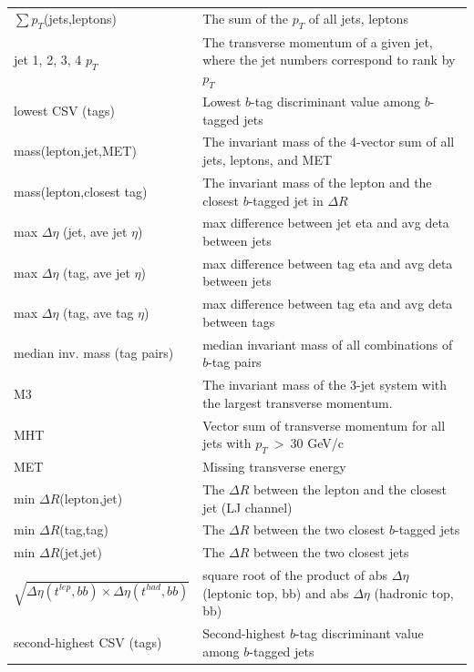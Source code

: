 \begin{table}[hbtp]
\begin{tabular}{| l | p{10cm} |}
   \(\sum p_{T}\)(jets,leptons)  							&  The sum of the \(p_{T}\) of all jets, leptons \\
   jet 1, 2, 3, 4 \(p_{T}\)  							&  The transverse momentum of a given jet, where the jet numbers correspond to rank by \(p_{T}\) \\
   lowest CSV (tags)  								&  Lowest $b$-tag discriminant value among $b$-tagged jets \\
   mass(lepton,jet,MET)  								&  The invariant mass of the 4-vector sum of all jets, leptons, and MET \\
   mass(lepton,closest tag) 							& The invariant mass of the lepton and the closest $b$-tagged jet in \(\Delta R\) \\
   max \(\Delta \eta\) (jet, ave jet \(\eta\))  					&  max difference between jet eta and avg deta between jets \\
   max \(\Delta \eta\) (tag, ave jet \(\eta\)) 					&  max difference between tag eta and avg deta between jets \\
   max \(\Delta \eta\) (tag, ave tag \(\eta\)) 					&  max difference between tag eta and avg deta between tags \\
   median inv. mass (tag pairs)							&  median invariant mass of all combinations of $b$-tag pairs \\
   M3										& The invariant mass of the 3-jet system with the largest transverse momentum. \\
   MHT  										&  Vector sum of transverse momentum for all jets with \(p_{T}~>~30\) GeV/c \\
   MET  										&  Missing transverse energy \\
   min \(\Delta R\)(lepton,jet)  							&  The \(\Delta R\) between the lepton and the closest jet (LJ channel)  \\
   min \(\Delta R\)(tag,tag) 	 						&  The \(\Delta R\) between the two closest $b$-tagged jets \\
   min \(\Delta R\)(jet,jet)  							&  The \(\Delta R\) between the two closest jets \\
   $\sqrt{\Delta \eta(t^{lep}, bb) \times \Delta \eta(t^{had}, bb)}$		&  square root of the product of abs \(\Delta \eta\) (leptonic top, bb) and abs \(\Delta \eta\) (hadronic top, bb) \\
   second-highest CSV (tags)  							&  Second-highest $b$-tag discriminant value among $b$-tagged jets \\

\end{tabular}
\end{table}
